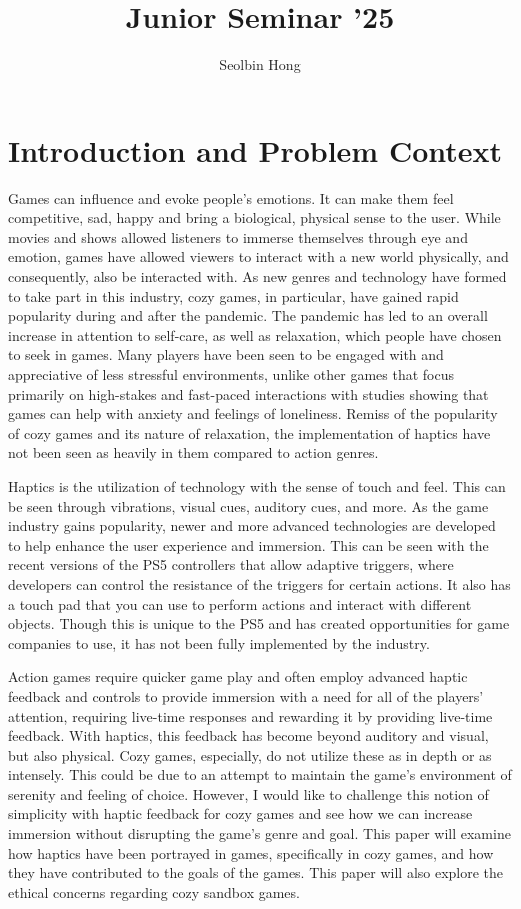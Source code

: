 \documentclass[10pt,twocolumn]{article}
\title{Junior Seminar '25}
\author{Seolbin Hong}
\affiliation{Occidental College}
\begin{document}
\maketitle



\section{Introduction and Problem Context}
Games can influence and evoke people's emotions. It can make them feel competitive, sad, happy and bring a biological, physical sense to the user. While movies and shows allowed listeners to immerse themselves through eye and emotion, games have allowed viewers to interact with a new world physically, and consequently, also be interacted with. As new genres and technology have formed to take part in this industry, cozy games, in particular, have gained rapid popularity during and after the pandemic. The pandemic has led to an overall increase in attention to self-care, as well as relaxation, which people have chosen to seek in games\cite{Pandemic}. Many players have been seen to be engaged with and appreciative of less stressful environments, unlike other games that focus primarily on high-stakes and fast-paced interactions with studies showing that games can help with anxiety and feelings of loneliness.\cite{Cozy} Remiss of the popularity of cozy games and its nature of relaxation, the implementation of haptics have not been seen as heavily in them compared to action genres. 

Haptics is the utilization of technology with the sense of touch and feel. This can be seen through vibrations, visual cues, auditory cues, and more. As the game industry gains popularity, newer and more advanced technologies are developed to help enhance the user experience and immersion. This can be seen with the recent versions of the PS5 controllers that allow adaptive triggers, where developers can control the resistance of the triggers for certain actions. It also has a touch pad that you can use to perform actions and interact with different objects. Though this is unique to the PS5 and has created opportunities for game companies to use, it has not been fully implemented by the industry. 

Action games require quicker game play and  often employ advanced haptic feedback and controls to provide immersion with a need for all of the players' attention, requiring live-time responses and rewarding it by providing live-time feedback. With haptics, this feedback has become beyond auditory and visual, but also physical. Cozy games, especially, do not utilize these as in depth or as intensely. This could be due to an attempt to maintain the game's environment of serenity and feeling of choice. However, I would like to challenge this notion of simplicity with haptic feedback for cozy games and see how we can increase immersion without disrupting the game's genre and goal. This paper will examine how haptics have been portrayed in games, specifically in cozy games, and how they have contributed to the goals of the games. This paper will also explore the ethical concerns regarding cozy sandbox games.
\end{document}

